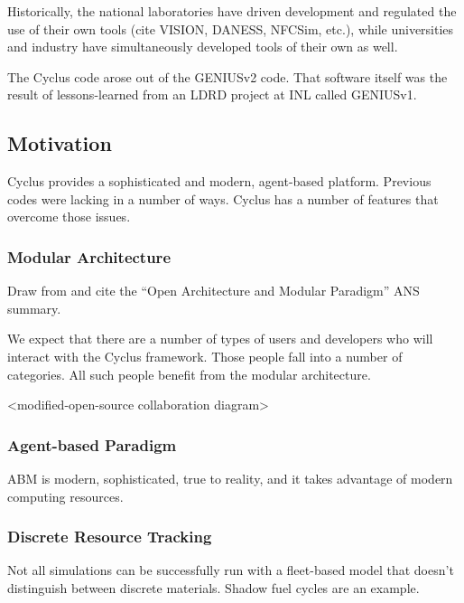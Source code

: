 Historically, the national laboratories have driven development and regulated 
the use of their own tools (cite VISION, DANESS, NFCSim, etc.), while 
universities and industry have simultaneously developed tools of their own as 
well. 

The Cyclus code arose out of the GENIUSv2 code. That software itself was the 
result of lessons-learned from an LDRD project at INL called GENIUSv1. 


\subsection{Motivation}

Cyclus provides a sophisticated and modern, agent-based platform. Previous 
codes were lacking in a number of ways. Cyclus has a number of features that 
overcome those issues.  

\subsubsection{Modular Architecture}

Draw from and cite the ``Open Architecture and Modular Paradigm'' ANS summary.

We expect that there are a number of types of users and developers who will 
interact with the Cyclus framework. Those people fall into a number of 
categories. All such people benefit from the modular architecture. 

<modified-open-source collaboration diagram>

\subsubsection{Agent-based Paradigm}

ABM is modern, sophisticated, true to reality, and it takes advantage of modern 
computing resources. 


\subsubsection{Discrete Resource Tracking}

Not all simulations can be successfully run with a fleet-based model that 
doesn't distinguish between discrete materials. Shadow fuel cycles are an 
example. 

